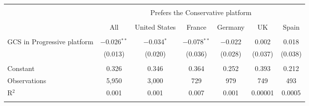 
\begin{tabular}{@{\extracolsep{5pt}}lcccccc} 
\\[-1.8ex]\hline 
\hline \\[-1.8ex] 
 & \multicolumn{6}{c}{Prefers the Conservative platform} \\ 
\cline{2-7} 
\\[-1.8ex] & All & United States & France & Germany & UK & Spain \\ 
\hline \\[-1.8ex] 
 GCS in Progressive platform & $-$0.026$^{**}$ & $-$0.034$^{*}$ & $-$0.078$^{**}$ & $-$0.022 & 0.002 & 0.018 \\ 
  & (0.013) & (0.020) & (0.036) & (0.028) & (0.037) & (0.038) \\ 
 \hline \\[-1.8ex] 
Constant & 0.326 & 0.346 & 0.364 & 0.252 & 0.393 & 0.212 \\ 
Observations & 5,950 & 3,000 & 729 & 979 & 749 & 493 \\ 
R$^{2}$ & 0.001 & 0.001 & 0.007 & 0.001 & 0.00001 & 0.0005 \\ 
\hline 
\hline \\[-1.8ex] 
\end{tabular} 
